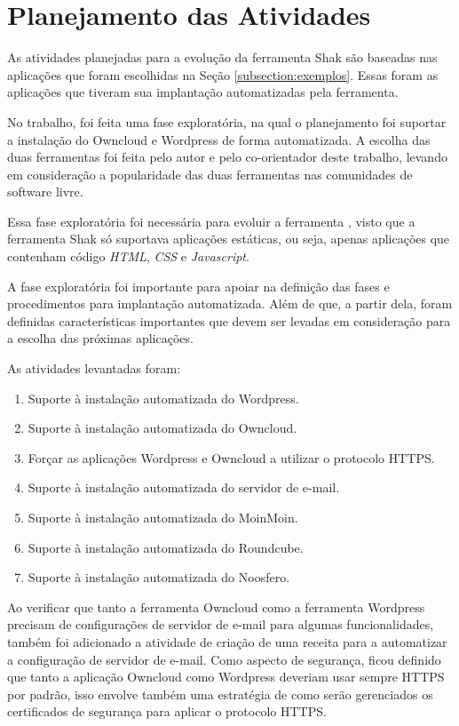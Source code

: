 \section{Planejamento das Atividades}

As atividades planejadas para a evolução da ferramenta Shak são baseadas nas 
aplicações que foram escolhidas na Seção
\ref{subsection:exemplos}. Essas foram as aplicações que tiveram
sua implantação automatizadas pela ferramenta. 

No trabalho, foi feita uma fase exploratória, na qual o planejamento foi
suportar a instalação do Owncloud e Wordpress de forma 
automatizada. A escolha das duas ferramentas foi feita pelo autor e pelo co-orientador
deste trabalho, levando em consideração a popularidade das duas ferramentas nas 
comunidades de software livre. 

Essa fase exploratória foi necessária para evoluir a ferramenta
, visto que a ferramenta Shak só suportava aplicações estáticas, ou seja, apenas 
aplicações que contenham 
código \textit{HTML}, \textit{CSS} e \textit{Javascript}. 

A fase exploratória foi importante para apoiar na definição das fases e 
procedimentos para implantação
automatizada. Além de que, a partir dela, foram definidas características importantes 
que devem ser levadas em consideração para a escolha das próximas aplicações.

As atividades levantadas foram:

 \begin{enumerate}
   \item  Suporte à instalação automatizada do Wordpress.
   \item  Suporte à instalação automatizada do Owncloud.
   \item  Forçar as aplicações Wordpress e Owncloud a
   utilizar o protocolo HTTPS.
   \item  Suporte à instalação automatizada do servidor de e-mail.
   \item  Suporte à instalação automatizada do MoinMoin.
   \item  Suporte à instalação automatizada do Roundcube.
   \item  Suporte à instalação automatizada do Noosfero.
 \end{enumerate}

Ao verificar que tanto a ferramenta Owncloud como a ferramenta Wordpress precisam
de configurações de servidor de e-mail para algumas funcionalidades, também foi adicionado
a atividade de criação de uma receita para a automatizar a configuração de
servidor de e-mail. Como aspecto de segurança, ficou definido que tanto a aplicação
Owncloud como Wordpress deveriam usar sempre HTTPS por padrão, isso envolve também
uma estratégia de como serão gerenciados os certificados de segurança para aplicar
o protocolo HTTPS. 

